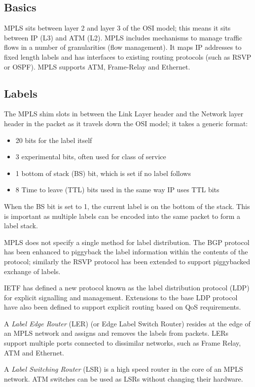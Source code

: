 \subsection{Basics}
MPLS sits between layer 2 and layer 3 of the OSI model; this means it sits between IP (L3) and ATM (L2). MPLS includes mechanisms to manage traffic flows in a number of granularities (flow management). It maps IP addresses to fixed length labels and has interfaces to existing routing protocols (such as RSVP or OSPF). MPLS supports ATM, Frame-Relay and Ethernet.

\subsection{Labels}
The MPLS shim slots in between the Link Layer header and the Network layer header in the packet as it travels down the OSI model; it takes a generic format:
\begin{itemize}
    \item 20 bits for the label itself
    \item 3 experimental bits, often used for class of service
    \item 1 bottom of stack (BS) bit, which is set if no label follows
    \item 8 Time to leave (TTL) bits used in the same way IP uses TTL bits
\end{itemize}

When the BS bit is set to 1, the current label is on the bottom of the stack. This is important as multiple labels can be encoded into the same packet to form a label stack. 

MPLS does not specify a single method for label distribution. The BGP protocol has been enhanced to piggyback the label information within the contents of the protocol; similarly the RSVP protocol has been extended to support piggybacked exchange of labels.

IETF has defined a new protocol known as the label distribution protocol (LDP) for explicit signalling and management. Extensions to the base LDP protocol have also been defined to support explicit routing based on QoS requirements. 

A \textit{Label Edge Router} (LER) (or Edge Label Switch Router) resides at the edge of an MPLS network and assigns and removes the labels from packets. LERs support multiple ports connected to dissimilar networks, such as Frame Relay, ATM and Ethernet.

A \textit{Label Switching Router} (LSR) is a high speed router in the core of an MPLS network. ATM switches can be used as LSRs without changing their hardware. 

